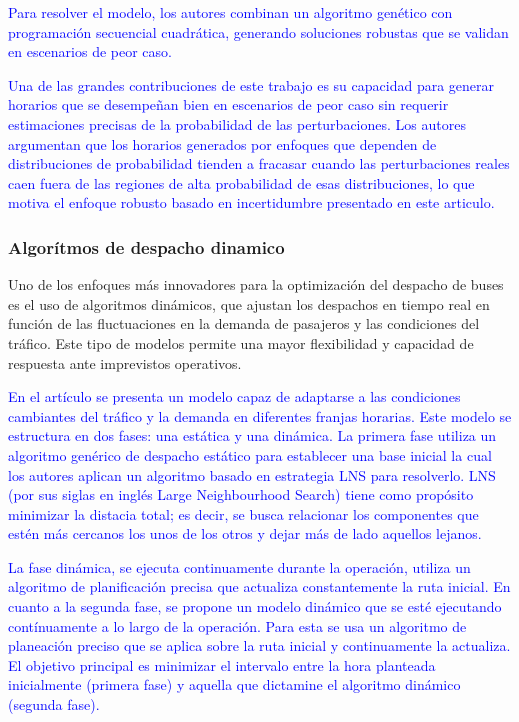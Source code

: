 \documentclass[preprint,11pt]{elsarticle}
\newcommand{\Blue}[1]{\textcolor{blue}{#1}}
\begin{document}
\Blue{Para resolver el modelo, los autores combinan un algoritmo genético con programación secuencial cuadrática, generando soluciones robustas que se validan en escenarios de peor caso.}

\Blue{Una de las grandes contribuciones de este trabajo es su capacidad para generar horarios que se desempeñan bien en escenarios de peor caso sin requerir estimaciones precisas de la probabilidad de las perturbaciones. Los autores argumentan que los horarios generados por enfoques que dependen de distribuciones de probabilidad tienden a fracasar cuando las perturbaciones reales caen fuera de las regiones de alta probabilidad de esas distribuciones, lo que motiva el enfoque robusto basado en incertidumbre presentado en este articulo.}


\subsubsection{Algorítmos de despacho dinamico}
Uno de los enfoques más innovadores para la optimización del despacho de buses es el uso de algoritmos dinámicos, que ajustan los despachos en tiempo real en función de las fluctuaciones en la demanda de pasajeros y las condiciones del tráfico. Este tipo de modelos permite una mayor flexibilidad y capacidad de respuesta ante imprevistos operativos.


\Blue{En el artículo \cite{guan2022} se presenta un modelo capaz de adaptarse a las condiciones cambiantes del tráfico y la demanda en diferentes franjas horarias. Este modelo se estructura en dos fases: una estática y una dinámica. La primera fase utiliza un algoritmo genérico de despacho estático para establecer una base inicial la cual los autores aplican un algoritmo basado en estrategia LNS para resolverlo. LNS (por sus siglas en inglés Large Neighbourhood Search) tiene como propósito minimizar la distacia total; es decir, se busca relacionar los componentes que estén más cercanos los unos de los otros y dejar más de lado aquellos lejanos.} 
\

\Blue{La fase dinámica, se ejecuta continuamente durante la operación, utiliza un algoritmo de planificación precisa que actualiza constantemente la ruta inicial. En cuanto a la segunda fase, se propone un modelo dinámico que se esté ejecutando contínuamente a lo largo de la operación. Para esta se usa un algoritmo de planeación preciso que se aplica sobre la ruta inicial y continuamente la actualiza. El objetivo principal es minimizar el intervalo entre la hora planteada inicialmente (primera fase) y aquella que dictamine el algoritmo dinámico (segunda fase).}
\end{document}
